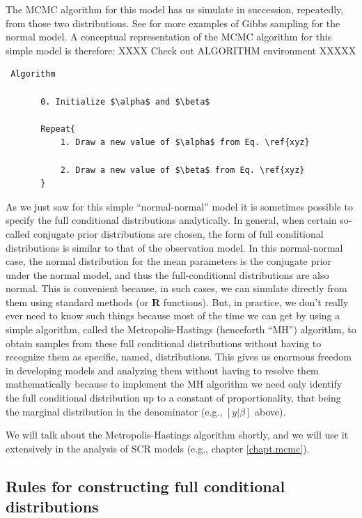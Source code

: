 The MCMC algorithm for this model has us simulate in succession,
repeatedly, from those two distributions. See \citet{gelman_etal:2004}
for more examples of Gibbs sampling for the normal model. A
conceptual representation of the MCMC algorithm for this simple model
is therefore:
XXXX Check out ALGORITHM environment XXXXX
\begin{verbatim}
 Algorithm

       0. Initialize $\alpha$ and $\beta$

       Repeat{
           1. Draw a new value of $\alpha$ from Eq. \ref{xyz}

           2. Draw a new value of $\beta$ from Eq. \ref{xyz}
       }
\end{verbatim}

As we just saw for this simple ``normal-normal'' model it is sometimes
possible to specify the full conditional distributions
analytically. In general, when certain so-called conjugate prior
distributions are chosen, the form of full conditional distributions
is similar to that of the observation model. In this normal-normal
case, the normal distribution for the mean parameters is the conjugate
prior under the normal model, and thus the full-conditional
distributions are also normal. This is convenient because, in such
cases, we can simulate directly from them using standard methods (or
{\bf R}
functions).  But, in practice, we don't really ever need to know such
things because most of the time we can get by using a simple
algorithm, called the Metropolis-Hastings (henceforth ``MH'')
algorithm, to obtain samples from these full conditional distributions
without having to recognize them as specific, named, distributions.
This gives us enormous freedom in developing models
and analyzing them without having to resolve them mathematically
because to implement the MH algorithm we need only identify the full
conditional distribution up to a constant of proportionality, that
being the marginal distribution in the denominator (e.g., $[y|\beta]$
above).

We will talk about the Metropolis-Hastings algorithm shortly, and we
will use it extensively in the analysis of SCR models (e.g., chapter
\ref{chapt.mcmc}).

\subsection{Rules for constructing full conditional distributions}
\label{glms.sec.rules}

